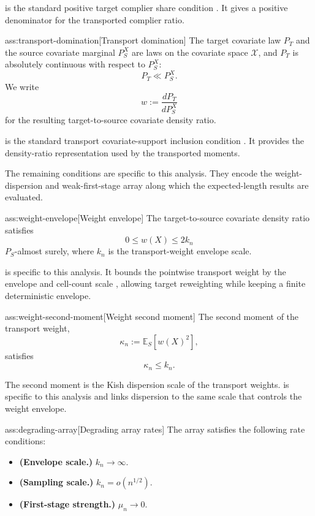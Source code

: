  is the standard positive target complier share condition \citep{ChenHuang2025}. It gives a positive denominator for the transported complier ratio.

\begin{assumptionv}{ass:transport-domination}[Transport domination]
The target covariate law \(P_T\) and the source covariate marginal \(P_S^X\) are laws on the covariate space \(\mathcal X\), and \(P_T\) is absolutely continuous with respect to \(P_S^X\):
\[
P_T\ll P_S^X.
\]
We write
\[
w:=\frac{dP_T}{dP_S^X}
\]
for the resulting target-to-source covariate density ratio.
\end{assumptionv}

 is the standard transport covariate-support inclusion condition \citep{ChenHuang2025}. It provides the density-ratio representation used by the transported moments.

The remaining conditions are specific to this analysis. They encode the weight-dispersion and weak-first-stage array along which the expected-length results are evaluated.

\begin{assumptionv}{ass:weight-envelope}[Weight envelope]
The target-to-source covariate density ratio satisfies
\[
0 \le w(X) \le 2k_n
\]
\(P_S\)-almost surely, where \(k_n\) is the transport-weight envelope scale.
\end{assumptionv}

 is specific to this analysis. It bounds the pointwise transport weight by the envelope and cell-count scale , allowing target reweighting while keeping a finite deterministic envelope.

\begin{assumptionv}{ass:weight-second-moment}[Weight second moment]
The second moment of the transport weight,
\[
\kappa_n:=\mathbb E_S\!\left[w(X)^2\right],
\]
satisfies
\[
\kappa_n \le k_n .
\]
\end{assumptionv}

The second moment  is the Kish dispersion scale of the transport weights.  is specific to this analysis and links dispersion to the same scale that controls the weight envelope.

\begin{assumptionv}{ass:degrading-array}[Degrading array rates]
The array satisfies the following rate conditions:
\begin{itemize}
\item \textbf{(Envelope scale.)} \(k_n \to \infty\).
\item \textbf{(Sampling scale.)} \(k_n=o(n^{1/2})\).
\item \textbf{(First-stage strength.)} \(\mu_n\to0\).
\end{itemize}
\end{assumptionv}

